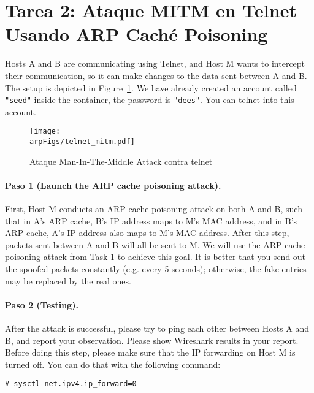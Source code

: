 \section{Tarea 2: Ataque MITM en Telnet Usando ARP Caché Poisoning}

Hosts A and B are communicating using Telnet, and Host M wants to intercept their
communication, so it can make changes to the data sent between A and B. The setup is depicted
in Figure~\ref{arp:fig:telnet_mitm}. We have already created an account called
\texttt{"seed"} inside the container, the password is \texttt{"dees"}. You can 
telnet into this account. 

\begin{figure}
    \centering
    \texttt{[image: \\arpFigs/telnet\_mitm.pdf]}
    \caption{Ataque Man-In-The-Middle Attack contra telnet}
    \label{arp:fig:telnet_mitm}
\end{figure}


\paragraph{Paso 1 (Launch the ARP cache poisoning attack).} First, Host M conducts an ARP cache
poisoning attack on both A and B, such that in A's ARP cache, B's IP address maps to M's MAC
address, and in B's ARP cache, A's IP address also maps to M's MAC address. After this step,
packets sent between A and B will all be sent to M. We will use the ARP cache poisoning attack
from Task 1 to achieve this goal. It is better that you send out the spoofed packets
constantly (e.g. every 5 seconds); otherwise, the fake entries may be replaced by 
the real ones. 



\paragraph{Paso 2 (Testing).} After the attack is successful, please try to ping each other
between Hosts A and B, and report your observation. Please show Wireshark results in your
report. Before doing this step, please make sure that the IP forwarding on Host M is turned
off. You can do that with the following command:

\begin{lstlisting}
# sysctl net.ipv4.ip_forward=0
\end{lstlisting}


